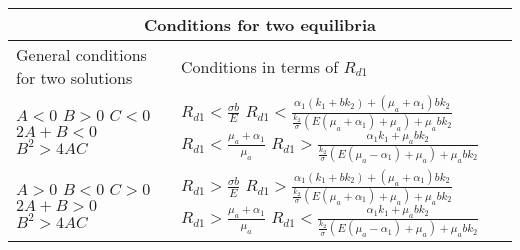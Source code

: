 \setlength{\arrayrulewidth}{.5mm}
\setlength{\tabcolsep}{20pt}
\renewcommand{\arraystretch}{2}

\begin{tabular}{ |p{5.5cm}|p{6cm}|}
\hline
\multicolumn{2}{|c|}{Conditions for two equilibria} \\ 
\hline
General conditions for two solutions & Conditions in terms of $R_{d1}$ \\
\hline
$A < 0$ \newline
$B > 0$ \newline
$C < 0$ \newline
$2A + B < 0$ \newline
$B^2 > 4AC$

&

$R_{d1} < \displaystyle\frac{\sigma b}{E}$ \newline
$R_{d1} < \displaystyle\frac{\alpha_1(k_1 + bk_2) + (\mu_a + \alpha_1)bk_2}{\displaystyle\frac{k_2}{\sigma}(E(\mu_a +\alpha_1) + \mu_a) + \mu_abk_2}$\newline
$R_{d1} < \displaystyle\frac{\mu_a+\alpha_1}{\mu_a}$\newline
$R_{d1} > \displaystyle\frac{\alpha_1k_1 + \mu_abk_2}{\displaystyle\frac{k_2}{\sigma}(E(\mu_a-\alpha_1)+\mu_a)+\mu_abk_2}$ \\

\hline
$A > 0$\newline
$B < 0$\newline
$C > 0$\newline
$2A + B > 0$ \newline
$B^2 > 4AC$

& 


$R_{d1} > \displaystyle\frac{\sigma b}{E}$ \newline
$R_{d1} > \displaystyle\frac{\alpha_1(k_1 + bk_2) + (\mu_a + \alpha_1)bk_2}{\displaystyle\frac{k_2}{\sigma}(E(\mu_a +\alpha_1) + \mu_a) + \mu_abk_2}$\newline
$R_{d1} > \displaystyle\frac{\mu_a+\alpha_1}{\mu_a}$\newline
$R_{d1} < \displaystyle\frac{\alpha_1k_1 + \mu_abk_2}{\displaystyle\frac{k_2}{\sigma}(E(\mu_a-\alpha_1)+\mu_a)+\mu_abk_2}$ \\

\hline

\end{tabular}